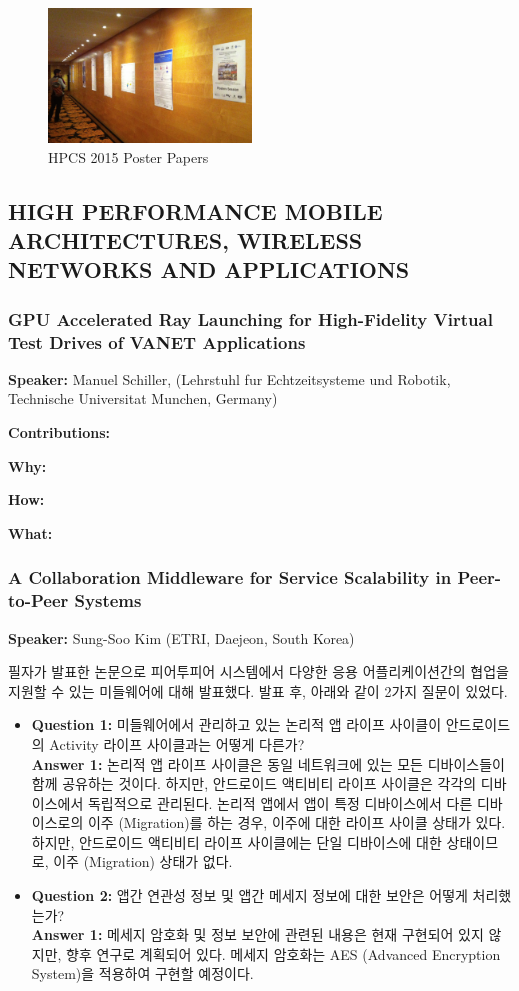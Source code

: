 \documentclass[twocolumn]{article}
\newcommand{\bi}{\begin{itemize}}
\newcommand{\ei}{\end{itemize}}
\newcommand{\ii}{\item}
\begin{document}
\begin{figure}[htb]
        \centering
        \includegraphics[width=0.48\textwidth]{posters.png}
        \caption{HPCS 2015 Poster Papers}
        \label{fig:posters}
\end{figure}

\subsection{HIGH PERFORMANCE MOBILE ARCHITECTURES, WIRELESS NETWORKS AND APPLICATIONS}
\subsubsection{GPU Accelerated Ray Launching for High-Fidelity Virtual Test Drives of VANET Applications}
\textbf{Speaker:} Manuel Schiller, (Lehrstuhl fur Echtzeitsysteme und Robotik, Technische Universitat Munchen, Germany)

\noindent
\textbf{Contributions:}  

\noindent
\textbf{Why:}  

\noindent
\textbf{How:}  

\noindent
\textbf{What:}  

\subsubsection{A Collaboration Middleware for Service Scalability in Peer-to-Peer Systems}
\textbf{Speaker:} Sung-Soo Kim (ETRI, Daejeon, South Korea)

필자가 발표한 논문으로 피어투피어 시스템에서 다양한 응용 어플리케이션간의 협업을 지원할 수 있는 미들웨어에 대해 발표했다.
발표 후, 아래와 같이 2가지 질문이 있었다.

\bi
\ii \textbf{Question 1:} 미들웨어에서 관리하고 있는 논리적 앱 라이프 사이클이 안드로이드의 Activity 라이프 사이클과는 어떻게 다른가?\\
\textbf{Answer 1:} 논리적 앱 라이프 사이클은 동일 네트워크에 있는 모든 디바이스들이 함께 공유하는 것이다. 하지만, 안드로이드 액티비티 라이프 사이클은 각각의 디바이스에서 독립적으로 관리된다. 논리적 앱에서 앱이 특정 디바이스에서 다른 디바이스로의 이주 (Migration)를 하는 경우, 이주에 대한 라이프 사이클 상태가 있다. 하지만, 안드로이드 액티비티 라이프 사이클에는 단일 디바이스에 대한 상태이므로, 이주 (Migration) 상태가 없다.
\ii \textbf{Question 2:} 앱간 연관성 정보 및 앱간 메세지 정보에 대한 보안은 어떻게 처리했는가?\\
\textbf{Answer 1:} 메세지 암호화 및 정보 보안에 관련된 내용은 현재 구현되어 있지 않지만, 향후 연구로 계획되어 있다. 메세지 암호화는 AES (Advanced Encryption System)을 적용하여 구현할 예정이다.
\ei
\end{document}
